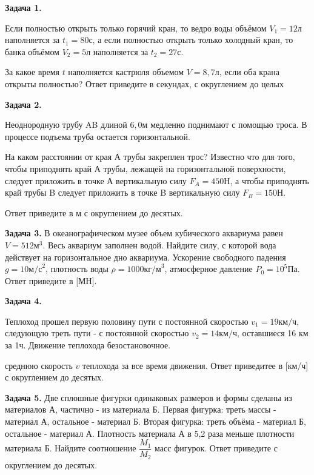 \documentclass{article}
\newcommand{\pdt}[1]{
	\par
	\begin{minipage}{.95\linewidth}
	\setlength{\parindent}{2em}
	{#1}
	\end{minipage}
	\linebreak
}
\newcommand{\pdtpr}[4]{
	\par
	\begin{minipage}{#3\linewidth}
	\setlength{\parindent}{2em}
	{#1}
	\end{minipage}
	\begin{minipage}{#4\linewidth}
	{\texttt{[image: \#2]}}
	\end{minipage}
	\linebreak
}
\begin{document}
\pdt{
\Large\textbf{Задача 1.}
 {Если полностью открыть только горячий кран, то ведро воды объёмом $V_1=12\textit{л}$ наполняется за $t_1=80\textit{с}$, а если полностью открыть только холодный кран, то банка объёмом $V_2=5\textit{л}$ наполняется за $t_2=27\textit{с}$.

 За какое время $t$ наполняется кастрюля объемом $V=8,7\textit{л}$, если оба крана открыты полностью? Ответ приведите в секундах, с округлением до целых}
 }
 \linebreak
\pdt{
\Large\textbf{Задача 2.}
 {Неоднородную трубу AB длиной $6,0 \textit{м}$ медленно поднимают с помощью троса. В процессе подъема труба остается горизонтальной.

 На каком расстоянии от края А трубы закреплен трос? Известно что для того, чтобы приподнять край А трубы, лежащей  на горизонтальной поверхности, следует приложить в точке А вертикальную силу $F_A=450\textit{Н}$, а чтобы приподнять край трубы B следует приложить в точке B вертикальную силу $F_B=150\textit{Н}$.

 Ответ приведите в м с округлением до десятых.}
 }
 \linebreak
\pdt{
\Large\textbf{Задача 3.}
 {В океанографическом музее объем кубического аквариума равен $V=512\textit{м}^3$. Весь аквариум заполнен водой. Найдите силу, с которой вода действует на горизонтальное дно аквариума. Ускорение свободного падения $g=10\textit{м/с}^2$, плотность воды $\rho=1000\textit{кг/м}^3$, атмосферное давление $P_0=10^5\textit{Па}$. Ответ приведите в [МН].
 }
 }
 \linebreak
\pdt{
\Large\textbf{Задача 4.}
 {Теплоход прошел первую половину пути с постоянной скоростью $v_1=19\textit{км/ч}$, следующую треть пути - с постоянной скоростью $v_2=14\textit{км/ч}$, оставшиеся 16 км за 1ч. Движение теплохода безостановочное.

 \noindentНайдите среднюю скорость $v$ теплохода за все время движения. Ответ приведитее в [км/ч] с округлением до десятых. 
 }
 }
 \linebreak
\pdt{
\Large\textbf{Задача 5.}
 {Две сплошные фигурки одинаковых размеров и формы сделаны из материалов А, частично - из материала Б. Первая фигурка: треть массы - материал А, остальное - материал Б. Вторая фигурка: треть объёма - материал Б, остальное - материал А. Плотность материала А в 5,2 раза меньше плотности материала Б. Найдите соотношение $\dfrac{M_1}{M_2}$ масс фигурок. Ответ приведите с округлением до десятых.
 }
}
\end{document}
